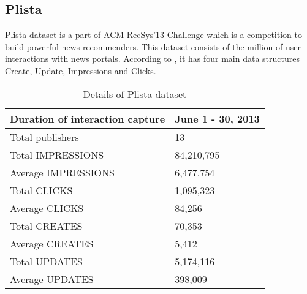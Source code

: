 \subsection{Plista}
Plista dataset is a part of ACM RecSys’13 Challenge which is a competition to build powerful news recommenders. This dataset consists of the million of user interactions with news portals. According to \cite{Plista}, it has four main data structures Create, Update, Impressions and Clicks.
\\
\begin{table}[!htbp] 
\centering
\footnotesize
\def\arraystretch{1.4}%
\centering
\begin{tabular}{|p{7cm}|p{3cm}|}
\hline
Duration of interaction capture & June 1 - 30, 2013
\\
\hline 
Total publishers & 13
\\
\hline 
Total IMPRESSIONS & 84,210,795
\\
\hline 
Average IMPRESSIONS  & 6,477,754
\\
\hline 
Total CLICKS & 1,095,323
\\
\hline
Average CLICKS & 84,256
\\
\hline
Total CREATES & 70,353 
\\
\hline
Average CREATES & 5,412
\\
\hline 
Total UPDATES & 5,174,116
\\
\hline 
Average UPDATES & 398,009
\\
\hline
\end{tabular}

\caption{Details of Plista dataset}
\label{table:14}
\end{table}
\\
